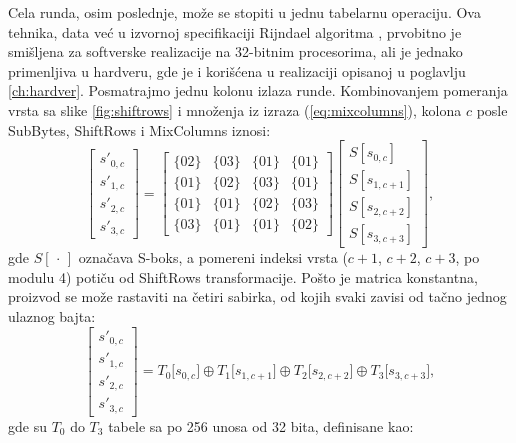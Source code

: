 Cela runda, osim poslednje, može se stopiti u jednu tabelarnu operaciju. Ova tehnika, data već u izvornoj specifikaciji Rijndael algoritma \cite{daemen_rijndael}, prvobitno je smišljena za softverske realizacije na 32-bitnim procesorima, ali je jednako primenljiva u hardveru, gde je i korišćena u realizaciji opisanoj u poglavlju \ref{ch:hardver}.
\smallbreak
Posmatrajmo jednu kolonu izlaza runde. Kombinovanjem pomeranja vrsta sa slike \ref{fig:shiftrows} i množenja iz izraza (\ref{eq:mixcolumns}), kolona $c$ posle SubBytes, ShiftRows i MixColumns iznosi:
\begin{equation}
\begin{bmatrix} s'_{0,c} \\ s'_{1,c} \\ s'_{2,c} \\ s'_{3,c} \end{bmatrix}
=
\begin{bmatrix}
\{02\} & \{03\} & \{01\} & \{01\} \\
\{01\} & \{02\} & \{03\} & \{01\} \\
\{01\} & \{01\} & \{02\} & \{03\} \\
\{03\} & \{01\} & \{01\} & \{02\}
\end{bmatrix}
\begin{bmatrix} S[s_{0,c}] \\ S[s_{1,c+1}] \\ S[s_{2,c+2}] \\ S[s_{3,c+3}] \end{bmatrix},
\label{eq:runda_kolona}
\end{equation}
gde $S[\,\cdot\,]$ označava S-boks, a pomereni indeksi vrsta ($c+1$, $c+2$, $c+3$, po modulu 4) potiču od ShiftRows transformacije. Pošto je matrica konstantna, proizvod se može rastaviti na četiri sabirka, od kojih svaki zavisi od tačno jednog ulaznog bajta:
\begin{equation}
    \begin{bmatrix} s'_{0,c} \\ s'_{1,c} \\ s'_{2,c} \\ s'_{3,c} \end{bmatrix}
    = T_0\big[s_{0,c}\big] \oplus T_1\big[s_{1,c+1}\big] \oplus T_2\big[s_{2,c+2}\big] \oplus T_3\big[s_{3,c+3}\big],
    \label{eq:ttabela_kolona}
\end{equation}
gde su $T_0$ do $T_3$ tabele sa po 256 unosa od 32 bita, definisane kao:
